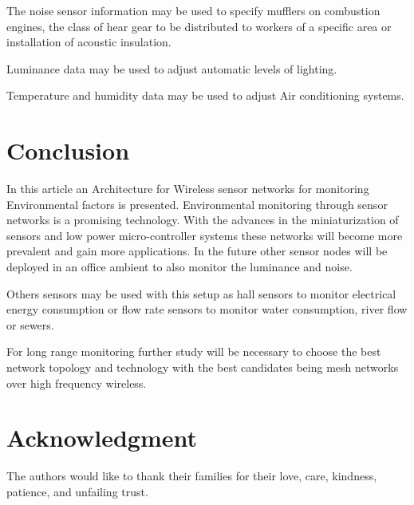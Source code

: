 \documentclass[letterpaper]{IEEEtran}
\begin{document}
The noise sensor information may be used to specify mufflers on combustion engines, the class of hear gear to be distributed to workers of a specific area or installation of acoustic insulation.

Luminance data may be used to adjust automatic levels of lighting.

Temperature and humidity data may be used to adjust Air conditioning systems.




\section{Conclusion}
In this article an Architecture for Wireless sensor networks for monitoring Environmental factors is presented.
Environmental monitoring through sensor networks is a promising technology. With the advances in the miniaturization of sensors and low power micro-controller systems these networks will become more prevalent and gain more applications. 
In the future other sensor nodes will be deployed in an office ambient to also monitor the luminance and noise. 

Others sensors may be used with this setup as hall sensors to monitor electrical energy consumption or flow rate sensors to monitor water consumption, river flow or sewers.

For long range monitoring further study will be necessary to choose the best network topology and technology with the best candidates being mesh networks over high frequency wireless. 

\section*{Acknowledgment}
The authors would like to thank their families for their love, care, kindness, patience, and unfailing trust.


\end{document}
